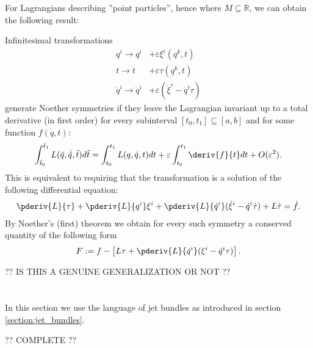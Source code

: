 
    For Lagrangians describing ''point particles'', hence where $M\subseteq\mathbb{R}$, we can obtain the following result:
    \begin{example}
        Infinitesimal transformations
        \begin{align*}
            q^i \longrightarrow q^i &+ \varepsilon\xi^i(q^k, t)\\
            t \longrightarrow t &+ \varepsilon\tau(q^k, t)\\
            \dot{q}^i \longrightarrow \dot{q}^i &+ \varepsilon(\dot{\xi}^i - \dot{q}^i\dot{\tau})
        \end{align*}
        generate Noether symmetries if they leave the Lagrangian invariant up to a total derivative (in first order) for every subinterval $[t_0, t_1]\subseteq[a, b]$ and for some function $f(q, t)$:
        \begin{gather}
            \int_{\tilde{t}_0}^{\tilde{t}_1}L(\tilde{q}, \dot{\tilde{q}}, \tilde{t})d\tilde{t} = \int_{t_0}^{t_1}L(q, \dot{q}, t)dt + \varepsilon\int_{t_0}^{t_1}\deriv{f}{t}dt + O(\varepsilon^2).
        \end{gather}
        This is equivalent to requiring that the transformation is a solution of the following differential equation:
        \begin{gather}
            \pderiv{L}{\tau} + \pderiv{L}{q^i}\xi^i + \pderiv{L}{\dot{q}^i}(\dot{\xi}^i - \dot{q}^i\dot{\tau}) + L\dot{\tau} = \dot{f}.
        \end{gather}
        By Noether's (first) theorem we obtain for every such symmetry a conserved quantity of the following form
        \begin{gather}
            F := f - \left[L\tau + \pderiv{L}{\dot{q}^i}(\xi^i - \dot{q}^i\tau)\right].
        \end{gather}
    \end{example}

    ?? IS THIS A GENUINE GENERALIZATION OR NOT ??

\section{}

    In this section we use the language of jet bundles as introduced in section \ref{section:jet_bundles}.

    ?? COMPLETE ??